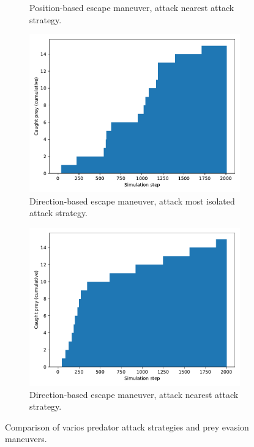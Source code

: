\documentclass[9pt]{pnas-new}
\begin{document}
\begin{figure}[h]
\begin{subfigure}[t]{0.4\linewidth}
        \caption{Position-based escape maneuver, attack nearest attack strategy.}
    \end{subfigure}
    \hspace{0.02\linewidth} %
    \begin{subfigure}[t]{0.4\linewidth}
        \includegraphics[width=\linewidth]{avoid_direction_attack_peripheral/predator_success_cumulative_2008.pdf}
        \caption{Direction-based escape maneuver, attack most isolated attack strategy.}
    \end{subfigure}%
    \hspace{0.02\linewidth} %
    \begin{subfigure}[t]{0.4\linewidth}
        \includegraphics[width=\linewidth]{avoid_direction_attack_nearest/predator_success_cumulative_2001.pdf}
        \caption{Direction-based escape maneuver, attack nearest attack strategy.}
    \end{subfigure}
    \caption{Comparison of varios predator attack strategies and prey evasion maneuvers.}
	\label{fig:sim_results_01}
\end{figure}
\end{document}
